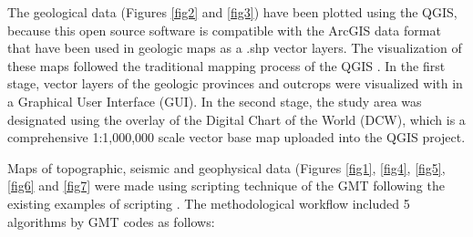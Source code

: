 \documentclass[sustainability,article,submit,pdftex,moreauthors]{Definitions/mdpi}
\begin{document}
The geological data (Figures \ref{fig2} and \ref{fig3}) have been plotted using the QGIS, because this open source software is compatible with the ArcGIS data format that have been used in geologic maps as a .shp vector layers. The visualization of these maps followed the traditional mapping process of the QGIS \cite{Lemenkova2022a}. In the first stage, vector layers of the geologic provinces and outcrops were visualized with in a Graphical User Interface (GUI). In the second stage, the study area was designated using the overlay of the Digital Chart of the World (DCW), which is a comprehensive 1:1,000,000 scale vector base map uploaded into the QGIS project. 

Maps of topographic, seismic and geophysical data (Figures \ref{fig1}, \ref{fig4}, \ref{fig5}, \ref{fig6} and \ref{fig7} were made using scripting technique of the GMT \cite{Wessel} following the existing examples of scripting \citep{Lemenkova2019a,Lemenkova2022b}. The methodological workflow included 5 algorithms by GMT codes as follows: 
\end{document}
